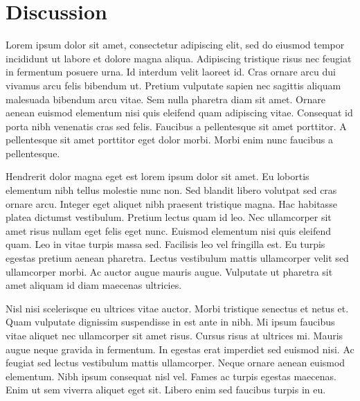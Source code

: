 \chapter{Discussion} \label{DD}

Lorem ipsum dolor sit amet, consectetur adipiscing elit, sed do eiusmod tempor incididunt ut labore et dolore magna aliqua. Adipiscing tristique risus nec feugiat in fermentum posuere urna. Id interdum velit laoreet id. Cras ornare arcu dui vivamus arcu felis bibendum ut. Pretium vulputate sapien nec sagittis aliquam malesuada bibendum arcu vitae. Sem nulla pharetra diam sit amet. Ornare aenean euismod elementum nisi quis eleifend quam adipiscing vitae. Consequat id porta nibh venenatis cras sed felis. Faucibus a pellentesque sit amet porttitor. A pellentesque sit amet porttitor eget dolor morbi. Morbi enim nunc faucibus a pellentesque.

Hendrerit dolor magna eget est lorem ipsum dolor sit amet. Eu lobortis elementum nibh tellus molestie nunc non. Sed blandit libero volutpat sed cras ornare arcu. Integer eget aliquet nibh praesent tristique magna. Hac habitasse platea dictumst vestibulum. Pretium lectus quam id leo. Nec ullamcorper sit amet risus nullam eget felis eget nunc. Euismod elementum nisi quis eleifend quam. Leo in vitae turpis massa sed. Facilisis leo vel fringilla est. Eu turpis egestas pretium aenean pharetra. Lectus vestibulum mattis ullamcorper velit sed ullamcorper morbi. Ac auctor augue mauris augue. Vulputate ut pharetra sit amet aliquam id diam maecenas ultricies.

Nisl nisi scelerisque eu ultrices vitae auctor. Morbi tristique senectus et netus et. Quam vulputate dignissim suspendisse in est ante in nibh. Mi ipsum faucibus vitae aliquet nec ullamcorper sit amet risus. Cursus risus at ultrices mi. Mauris augue neque gravida in fermentum. In egestas erat imperdiet sed euismod nisi. Ac feugiat sed lectus vestibulum mattis ullamcorper. Neque ornare aenean euismod elementum. Nibh ipsum consequat nisl vel. Fames ac turpis egestas maecenas. Enim ut sem viverra aliquet eget sit. Libero enim sed faucibus turpis in eu.
